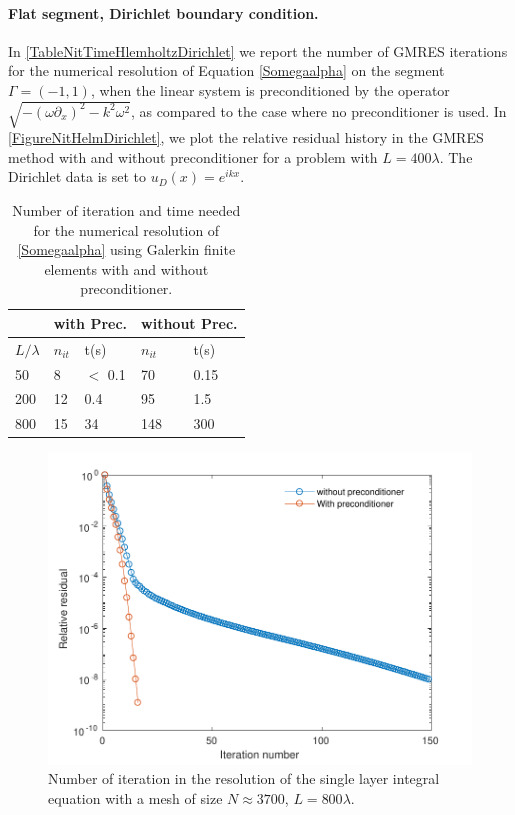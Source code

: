 \documentclass[a4paper]{article}
\begin{document}
\paragraph{Flat segment, Dirichlet boundary condition.} In \autoref{TableNitTimeHlemholtzDirichlet} we report the number of GMRES iterations for the numerical resolution of Equation \eqref{Somegaalpha} on the segment $\Gamma = (-1,1)$, when the linear system is preconditioned by the operator $\sqrt{-(\omega \partial_x)^2 - k^2 \omega^2}$, as compared to the case where no preconditioner is used.  In \autoref{FigureNitHelmDirichlet}, we plot the relative residual history in the GMRES method with and without preconditioner for a problem with $L = 400 \lambda$. The Dirichlet data is set to $u_D(x) = e^{ikx}$. 
\begin{table}[H]
	\begin{center}
		\begin{tabular}{|| m{4em} | m{4em} | m{4em} | m{4em} | m{4em}||} 
			\hline
			\multicolumn{1}{||c|}{ }&
			\multicolumn{2}{c|}{with Prec.}&\multicolumn{2}{c||}{without Prec.}\\
			\hline
			$L/\lambda$ & $n_{it}$& t(s) & $n_{it}$ & t(s)\\
			\hline\hline
			50 & 8 & $<$ 0.1 & 70 & 0.15\\
			\hline
			200 & 12 & 0.4 & 95 & 1.5\\
			\hline
			800 & 15 & 34 & 148 & 300\\
			\hline
		\end{tabular}
	\end{center}
	\caption{Number of iteration and time needed for the numerical resolution of \eqref{Somegaalpha} using Galerkin finite elements with and without preconditioner.}
	\label{TableNitTimeHlemholtzDirichlet}
\end{table}
\vspace{-1cm}
\begin{figure}[H]
	\centering
	\includegraphics[scale=0.5]{../figs/PrecondDirichletHelmSegPDF}
	\caption{Number of iteration in the resolution of the single layer integral equation with a mesh of size $N \approx 3700$, $L = 800 \lambda$.}
	\label{FigureNitHelmDirichlet}
\end{figure}
\end{document}
